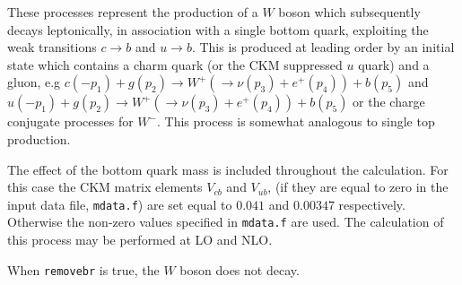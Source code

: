 \label{subsec:wb}

These processes represent the production of a $W$ boson which
subsequently decays leptonically, in association with a single bottom
quark, exploiting the weak transitions $c \to b$ and $u \to b$.
This is produced at leading order by an initial state which
contains a charm quark (or the CKM  suppressed $u$ quark) and a
gluon, e.g
$ c(-p_1)+g(p_2) \to W^+(\to \nu(p_3)+e^+(p_4))+b(p_5)$
and
$ u(-p_1)+g(p_2) \to W^+(\to \nu(p_3)+e^+(p_4))+b(p_5)$
or the charge conjugate processes for $W^{-}$.
This process is somewhat analogous to single top production.

The effect of the bottom quark mass is included throughout the calculation.  
For this case the CKM matrix elements $V_{cb}$ and $V_{ub}$,
(if they are equal to zero in the input data file, {\tt mdata.f})
are set equal to $0.041$ and $0.00347$ respectively. 
Otherwise the non-zero values specified in {\tt mdata.f} are used. 
The calculation of this process may
be performed at LO and NLO.

When {\tt removebr} is true, the $W$ boson does not decay.

